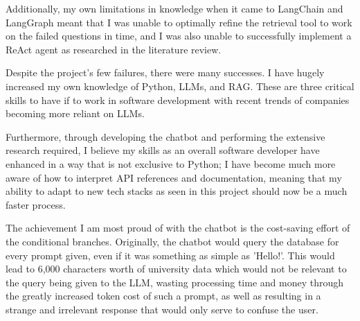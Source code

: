\para Additionally, my own limitations in knowledge when it came to LangChain and LangGraph meant that I was unable to optimally refine the 
retrieval tool to work on the failed questions in time, and I was also unable to successfully implement a ReAct agent as researched in the 
literature review.

\para Despite the project's few failures, there were many successes. I have hugely increased my own knowledge of Python, LLMs,
and RAG. These are three critical skills to have if to work in software development with recent trends of companies 
becoming more reliant on LLMs. 

\para Furthermore, through developing the chatbot and performing the extensive research required, I believe my skills as an overall software 
developer have enhanced in a way that is not exclusive to Python; I have become much more aware of how to interpret API references and documentation,
meaning that my ability to adapt to new tech stacks as seen in this project should now be a much faster process.

\para The achievement I am most proud of with the chatbot is the cost-saving effort of the conditional branches. Originally, the chatbot would 
query the database for every prompt given, even if it was something as simple as 'Hello!'. This would lead to 6,000 characters worth of university
data which would not be relevant to the query being given to the LLM, wasting processing time and money through the greatly increased token cost 
of such a prompt, as well as resulting in a strange and irrelevant response that would only serve to confuse the user. 

